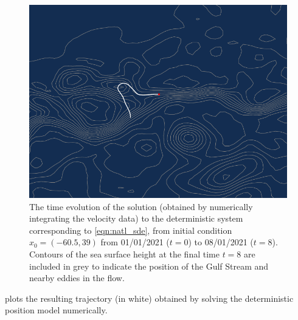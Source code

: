 \begin{figure}
	\begin{center}
		\includegraphics[width=\textwidth]{figures/gulf_stream_motivation/det_traj.pdf}
		\caption{The time evolution of the solution (obtained by numerically integrating the velocity data) to the deterministic system corresponding to \eqref{eqn:natl_sde}, from initial condition \(x_0 = \left(-60.5, 39\right)\) from 01/01/2021 (\(t = 0\)) to 08/01/2021 (\(t = 8\)).
			Contours of the sea surface height at the final time \(t = 8\) are included in grey to indicate the position of the Gulf Stream and nearby eddies in the flow.}
		\label{fig:na_motiv_det}
	\end{center}
\end{figure}

 plots the resulting trajectory (in white) obtained by solving the deterministic position model numerically.

